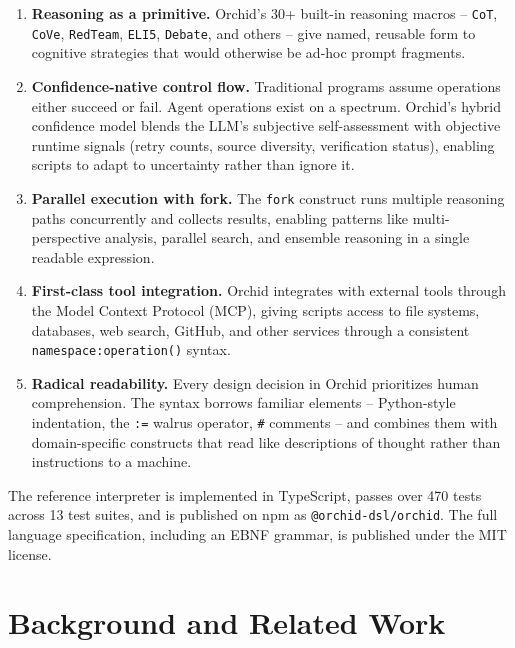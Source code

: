 \documentclass[11pt,a4paper]{article}
\begin{document}
\begin{enumerate}[leftmargin=*]
  \item \textbf{Reasoning as a primitive.} Orchid's 30+ built-in reasoning macros -- \texttt{CoT}, \texttt{CoVe}, \texttt{RedTeam}, \texttt{ELI5}, \texttt{Debate}, and others -- give named, reusable form to cognitive strategies that would otherwise be ad-hoc prompt fragments.

  \item \textbf{Confidence-native control flow.} Traditional programs assume operations either succeed or fail. Agent operations exist on a spectrum. Orchid's hybrid confidence model blends the LLM's subjective self-assessment with objective runtime signals (retry counts, source diversity, verification status), enabling scripts to adapt to uncertainty rather than ignore it.

  \item \textbf{Parallel execution with fork.} The \texttt{fork} construct runs multiple reasoning paths concurrently and collects results, enabling patterns like multi-perspective analysis, parallel search, and ensemble reasoning in a single readable expression.

  \item \textbf{First-class tool integration.} Orchid integrates with external tools through the Model Context Protocol (MCP), giving scripts access to file systems, databases, web search, GitHub, and other services through a consistent \texttt{namespace:operation()} syntax.

  \item \textbf{Radical readability.} Every design decision in Orchid prioritizes human comprehension. The syntax borrows familiar elements -- Python-style indentation, the \texttt{:=} walrus operator, \texttt{\#} comments -- and combines them with domain-specific constructs that read like descriptions of thought rather than instructions to a machine.
\end{enumerate}

The reference interpreter is implemented in TypeScript, passes over 470 tests across 13 test suites, and is published on npm as \texttt{@orchid-dsl/orchid}. The full language specification, including an EBNF grammar, is published under the MIT license.

\section{Background and Related Work}
\end{document}
